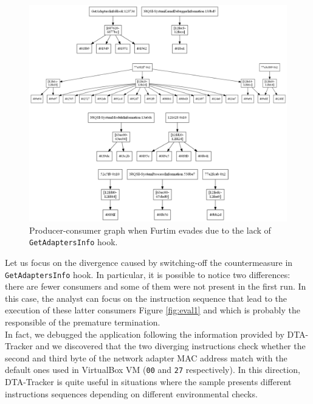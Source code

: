 \documentclass[LaM,binding=0.6cm]{sapthesis}
\begin{document}
\begin{figure}[h!]
\centering
\includegraphics[scale=.5]{images/eval3}
\caption{Producer-consumer graph when Furtim evades due to the lack of \texttt{GetAdaptersInfo} hook.}
\end{figure}

Let us focus on the divergence caused by switching-off the countermeasure in \texttt{GetAdaptersInfo} hook. In particular, it is possible to notice two differences: there are fewer consumers and some of them were not present in the first run. In this case, the analyst can focus on the instruction sequence that lead to the execution of these latter consumers Figure \autoref{fig:eval1} and which is probably the responsible of the premature termination.\\
In fact, we debugged the application following the information provided by DTA-Tracker and we discovered that the two diverging instructions check whether the second and third byte of the network adapter MAC address match with the default ones used in VirtualBox VM (\texttt{00} and \texttt{27} respectively). In this direction, DTA-Tracker is quite useful in situations where the sample presents different instructions sequences depending on different environmental checks.
\end{document}
